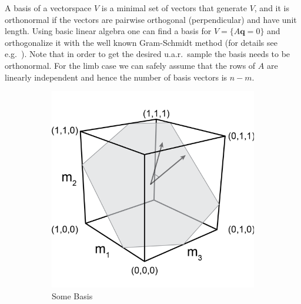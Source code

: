 A basis of a vectorspace $V$ is a minimal set of vectors that generate $V$, and it is orthonormal if the vectors are pairwise orthogonal (perpendicular) and have unit length. Using basic linear algebra one can find a basis for $V = \{A\textbf{q} = 0\}$ and orthogonalize it with the well known Gram-Schmidt method (for details see e.g.\ \cite{Robertson}). Note that in order to get the desired u.a.r.\ sample the basis needs to be orthonormal. For the limb case we can safely assume that the rows of $A$ are linearly independent and hence the number of basis vectors is $n-m$.



\begin{figure}
        \centering
        \begin{subfigure}[b]{0.25\textwidth}
                \includegraphics[width=\textwidth]{somebasis.png}
      \caption{Some Basis}
      \label{fig_somebasis}
              \end{subfigure} \hspace{0.5cm}
        \begin{subfigure}[b]{0.25\textwidth}

\end{subfigure}
\end{figure}
